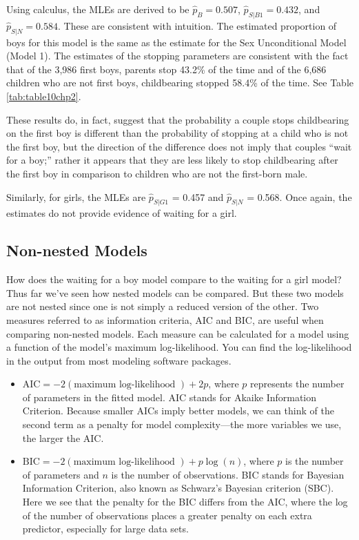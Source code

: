 \documentclass[
]{krantz}
\providecommand{\tightlist}{%
  \setlength{\itemsep}{0pt}\setlength{\parskip}{0pt}}
\begin{document}
Using calculus, the MLEs are derived to be \(\hat{p}_B = 0.507\), \(\hat{p}_{S|B1} = 0.432\), and \(\hat{p}_{S|N} = 0.584\). These are consistent with intuition. The estimated proportion of boys for this model is the same as the estimate for the Sex Unconditional Model (Model 1). The estimates of the stopping parameters are consistent with the fact that of the 3,986 first boys, parents stop 43.2\% of the time and of the 6,686 children who are not first boys, childbearing stopped 58.4\% of the time. See Table \ref{tab:table10chp2}.

These results do, in fact, suggest that the probability a couple stops childbearing on the first boy is different than the probability of stopping at a child who is not the first boy, but the direction of the difference does not imply that couples ``wait for a boy;'' rather it appears that they are less likely to stop childbearing after the first boy in comparison to children who are not the first-born male.

Similarly, for girls, the MLEs are \(\hat{p}_{S|G1}\) = 0.457 and \(\hat{p}_{S|N}\) = 0.568. Once again, the estimates do not provide evidence of waiting for a girl.

\hypertarget{non-nested-models}{%
\subsection{Non-nested Models}\label{non-nested-models}}

How does the waiting for a boy model compare to the waiting for a girl model? Thus far we've seen how nested models can be compared. But these two models are not nested since one is not simply a reduced version of the other. Two measures referred to as information criteria, AIC and BIC, are useful when comparing non-nested models. Each measure can be calculated for a model using a function of the model's maximum log-likelihood. You can find the log-likelihood in the output from most modeling software packages.

\begin{itemize}
\tightlist
\item
  \(\textrm{AIC} = -2 (\textrm{maximum log-likelihood }) + 2p\), where \(p\) represents the number of parameters in the fitted model. AIC stands for Akaike Information Criterion.  Because smaller AICs imply better models, we can think of the second term as a penalty for model complexity---the more variables we use, the larger the AIC.
\item
  \(\textrm{BIC} = -2 (\textrm{maximum log-likelihood }) + p\log(n)\), where \(p\) is the number of parameters and \(n\) is the number of observations. BIC stands for Bayesian Information Criterion,  also known as Schwarz's Bayesian criterion (SBC). Here we see that the penalty for the BIC differs from the AIC, where the log of the number of observations places a greater penalty on each extra predictor, especially for large data sets.
\end{itemize}
\end{document}
